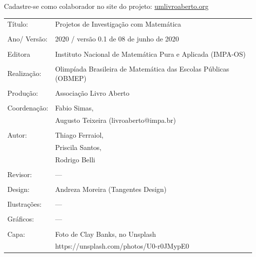 \vspace*{.3cm}

Cadastre-se como colaborador no site do projeto: \url{umlivroaberto.org}



\begin{tabular}{p{}p{}}
Título: & Projetos de Investigação com Matemática\\
\\
Ano/ Versão: & 2020 / versão 0.1 de 08 de junho de 2020\\
\\
Editora & Instituto Nacional de Matem\'atica Pura e Aplicada (IMPA-OS)\\
\\
Realização:& Olimp\'iada Brasileira de Matem\'atica das Escolas P\'ublicas (OBMEP)\\
\\
Produção:& Associação Livro Aberto\\
\\
Coordenação: & Fabio Simas, \\
			&  Augusto Teixeira (livroaberto@impa.br)\\
\\
  Autor: & Thiago Ferraiol, \\
         & Priscila Santos, \\
         & Rodrigo Belli \\
\\
Revisor: &  ---  \\
\\
Design: & Andreza Moreira (Tangentes Design) \\
\\
  Ilustrações: & --- \\ 
\\
Gráficos: & --- \\
\\
  Capa: & Foto de Clay Banks, no Unsplash \\
  		& https://unsplash.com/photos/U0-r0JMypE0 \\

\end{tabular}


